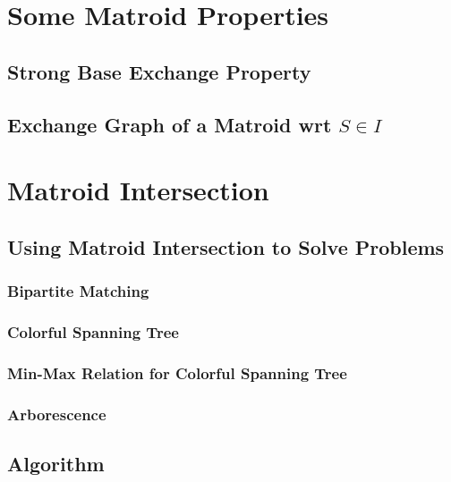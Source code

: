 \documentclass{article}
\begin{document}
\section{Some Matroid Properties}
\subsection{Strong Base Exchange Property}
\subsection{Exchange Graph of a Matroid wrt ${S\in I}$}

\section{Matroid Intersection}
\subsection{Using Matroid Intersection to Solve Problems}
\subsubsection{Bipartite Matching}
\subsubsection{Colorful Spanning Tree}
\subsubsection{Min-Max Relation for Colorful Spanning Tree}
\subsubsection{Arborescence}
\subsection{Algorithm}





\pagebreak
%
%
\end{document}

